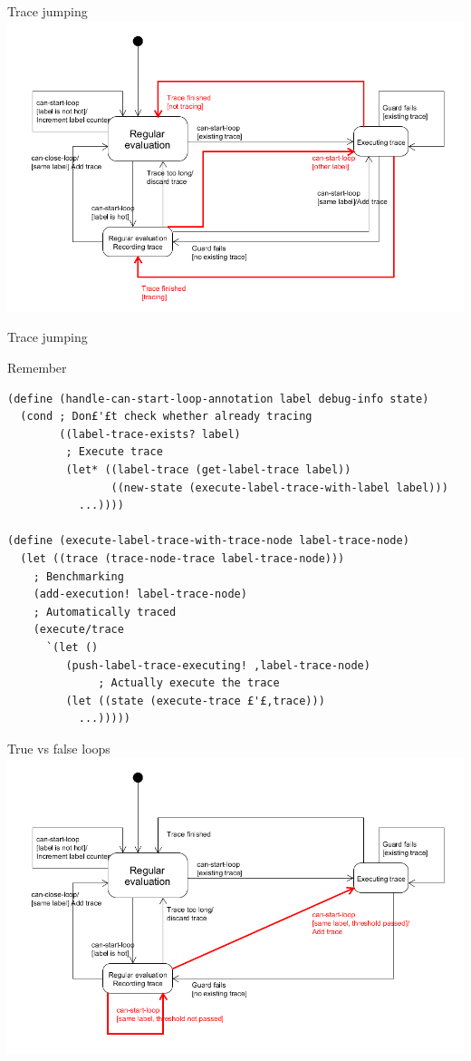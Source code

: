 \documentclass{beamer}
\begin{document}
\begin{frame}[fragile]{Trace jumping}
\includegraphics[scale=0.3]{stopping_trace_exec_while_tracing.png} 
\end{frame}

\begin{frame}[fragile]{Trace jumping}

Remember

\begin{lstlisting}[basicstyle = \tiny\ttfamily, escapechar = £]
(define (handle-can-start-loop-annotation label debug-info state)
  (cond ; Don£'£t check whether already tracing
        ((label-trace-exists? label)
         ; Execute trace
         (let* ((label-trace (get-label-trace label))
                ((new-state (execute-label-trace-with-label label)))
           ...))))
           
(define (execute-label-trace-with-trace-node label-trace-node)
  (let ((trace (trace-node-trace label-trace-node)))
    ; Benchmarking
    (add-execution! label-trace-node)
    ; Automatically traced
    (execute/trace
      `(let ()
         (push-label-trace-executing! ,label-trace-node)
              ; Actually execute the trace
         (let ((state (execute-trace £'£,trace))) 
           ...)))))
\end{lstlisting}
\end{frame}

\begin{frame}[fragile]{True vs false loops}
\includegraphics[scale=0.3]{high_level_state_diagram_true_loops.png} 
\end{frame}
\end{document}

